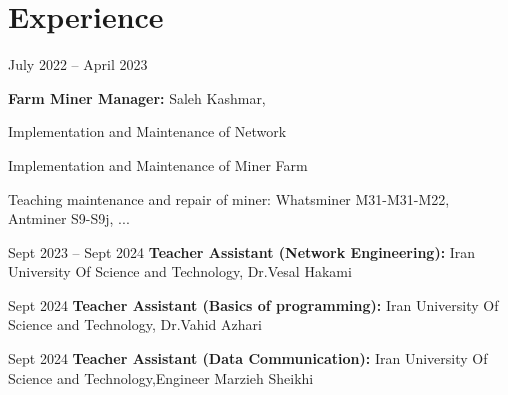 \section{Experience}
\begin{twocolentry}{July 2022 – April 2023}
	
	\textbf{Farm Miner Manager:} Saleh Kashmar, 
	\begin{highlights}
		\item Implementation and Maintenance of Network
		
		\item Implementation and Maintenance of Miner Farm 
		
		\item Teaching maintenance and repair of miner: Whatsminer M31-M31-M22, Antminer S9-S9j, ...
		
		
	\end{highlights}
\end{twocolentry}

\vspace{0.2 cm}	

\begin{twocolentry}{Sept 2023 – Sept 2024}
	\textbf{Teacher Assistant (Network Engineering):} Iran University Of Science and
	Technology, Dr.Vesal Hakami
\end{twocolentry}

\vspace{0.2 cm}	

\begin{twocolentry}{Sept 2024}
	\textbf{Teacher Assistant (Basics of programming):} Iran University Of Science and
	Technology, Dr.Vahid Azhari
\end{twocolentry}

\vspace{0.2 cm}	

\begin{twocolentry}{Sept 2024}
	\textbf{Teacher Assistant (Data Communication):} Iran University Of Science and
	Technology,Engineer Marzieh Sheikhi
\end{twocolentry}